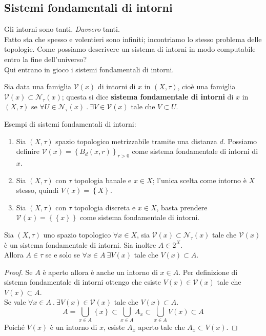 \subsection{\textcolor{TopGener}{\textbf{Sistemi fondamentali di intorni}}}



Gli intorni sono tanti. \textit{Davvero} tanti. \\ Fatto sta che spesso e volentieri sono infiniti; incontriamo lo stesso problema delle topologie. Come possiamo descrivere un sistema di intorni in modo computabile entro la fine dell'universo? \\ Qui entrano in gioco i sistemi fondamentali di intorni.


\begin{definition}
	Sia data una famiglia $\mathcal{V}(x)$ di intorni di $x$ in $(X,\tau)$, cioè una famiglia $\mathcal{V}(x) \subset \mathcal{N}_\tau(x)$; questa si dice \textbf{sistema fondamentale di intorni} di $x$ in $(X,\tau)$ se $\forall U \in \mathcal{N}_\tau(x)\ .\ \exists V \in \mathcal{V}(x)$ tale che $V \subset U$.
\end{definition}

\begin{example} Esempi di sistemi fondamentali di intorni:
\begin{enumerate} 
	\item Sia $(X,\tau)$ spazio topologico metrizzabile tramite una distanza $d$. Possiamo definire $\mathcal{V}(x) = \left\{B_d(x,r)\right\}_{r>0}$ come sistema fondamentale di intorni di $x$. 
	\item Sia $(X,\tau)$ con $\tau$ topologia banale e $x \in X$; l'unica scelta come intorno è $X$ stesso, quindi $V(x) = \left\{X\right\}$.
	\item Sia $(X,\tau)$ con $\tau$ topologia discreta e $x \in X$, basta prendere $\mathcal{V}(x) = \left\{\left\{x\right\}\right\}$ come sistema fondamentale di intorni.
\end{enumerate}
\end{example}

\begin{proposition}
	Sia $(X,\tau)$ uno spazio topologico $\forall x \in X$, sia $\mathcal{V}(x) \subset \mathcal{N}_\tau(x)$ tale che $\mathcal{V}(x)$ è un sistema fondamentale di intorni. Sia inoltre $A \in 2^X$. \\ Allora $A \in \tau$ se e solo se $\forall x \in A\ \exists V(x)$ tale che $V(x) \subset A$.
\end{proposition}
\begin{proof}
	Se $A$ è aperto allora è anche un intorno di $x \in A$. Per definizione di sistema fondamentale di intorni ottengo che esiste $V(x) \in \mathcal{V}(x)$ tale che $V(x) \subset A$.\\
	Se vale $\forall x \in A\ .\ \exists V(x) \in \mathcal{V}(x)$ tale che $V(x) \subset A$. 
	\begin{equation*}
		A = \bigcup_{x \in A} \left\{x\right\} \subset \bigcup_{x \in A} A_x \subset \bigcup_{x \in A} V(x) \subset A
	\end{equation*}
	Poiché $V(x)$ è un intorno di $x$, esiste $A_x$ aperto tale che $A_x \subset V(x)$.
\end{proof}

